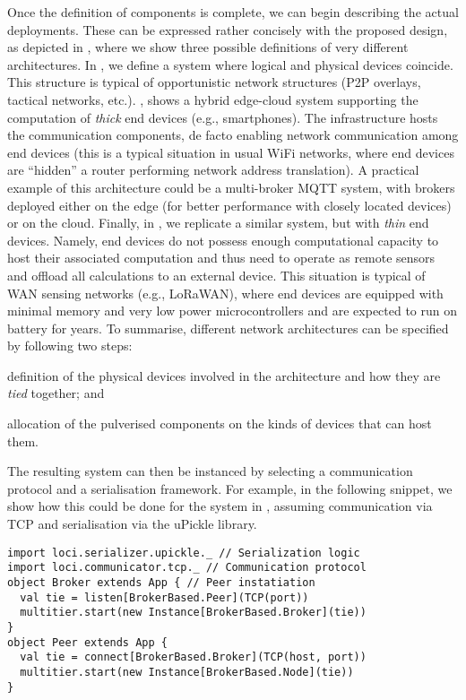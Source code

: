 Once the definition of components is complete, we can begin describing the actual deployments.
%
These can be expressed rather concisely with the proposed design, as depicted in ,
where we show three possible definitions of very different architectures.
%
In , we define a system where logical and physical devices coincide.
%
This structure is typical of opportunistic network structures (P2P overlays, tactical networks, etc.).
%
, shows a hybrid edge-cloud system supporting the computation of \emph{thick} end devices (e.g., smartphones).
%
The infrastructure hosts the communication components,
de facto enabling network communication among end devices
(this is a typical situation in usual WiFi networks, where end devices are ``hidden'' a router performing network address translation).
%
A practical example of this architecture could be a multi-broker MQTT system,
with brokers deployed either on the edge
(for better performance with closely located devices)
or on the cloud.
%
Finally, in , we replicate a similar system, but with \emph{thin} end devices.
%
Namely, end devices do not possess enough computational capacity to host their associated computation
and thus need to operate as remote sensors and offload all calculations to an external device.
%
This situation is typical of WAN sensing networks (e.g., LoRaWAN),
where end devices are equipped with minimal memory and very low power microcontrollers
and are expected to run on battery for years.
%
To summarise, different network architectures can be specified by following two steps:
\begin{enumerate*}
 \item definition of the physical devices involved in the architecture and how they are \emph{tied} together; and
 \item allocation of the pulverised components on the kinds of devices that can host them.
\end{enumerate*}

The resulting system can then be instanced by selecting a communication protocol and a serialisation framework.
%
For example, in the following snippet, we show how this could be done for the system in , assuming communication via TCP and serialisation via the uPickle library.

\begin{verbatim}
import loci.serializer.upickle._ // Serialization logic
import loci.communicator.tcp._ // Communication protocol
object Broker extends App { // Peer instatiation
  val tie = listen[BrokerBased.Peer](TCP(port))
  multitier.start(new Instance[BrokerBased.Broker](tie))
}
object Peer extends App {
  val tie = connect[BrokerBased.Broker](TCP(host, port))
  multitier.start(new Instance[BrokerBased.Node](tie))
}
\end{verbatim}

